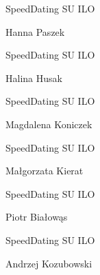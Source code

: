 \documentclass[a4paper,12pt]{article}
\begin{document}
\begin{minipage}[c]{\textwidth}
  \hline

  \hspace{0.5cm}

  SpeedDating SU ILO

  Hanna Paszek

  \hspace{0.5cm}

  \hline
\end{minipage}



\begin{minipage}[c]{\textwidth}
  \hline

  \hspace{0.5cm}

  SpeedDating SU ILO

  Halina Husak

  \hspace{0.5cm}

  \hline
\end{minipage}



\begin{minipage}[c]{\textwidth}
  \hline

  \hspace{0.5cm}

  SpeedDating SU ILO

  Magdalena Koniczek

  \hspace{0.5cm}

  \hline
\end{minipage}



\begin{minipage}[c]{\textwidth}
  \hline

  \hspace{0.5cm}

  SpeedDating SU ILO

  Małgorzata Kierat

  \hspace{0.5cm}

  \hline
\end{minipage}



\begin{minipage}[c]{\textwidth}
  \hline

  \hspace{0.5cm}

  SpeedDating SU ILO

  Piotr Białowąs

  \hspace{0.5cm}

  \hline
\end{minipage}



\begin{minipage}[c]{\textwidth}
  \hline

  \hspace{0.5cm}

  SpeedDating SU ILO

  Andrzej Kozubowski

  \hspace{0.5cm}

  \hline
\end{minipage}
\end{document}
